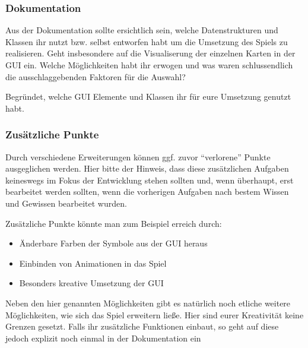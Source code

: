 \documentclass[a4paper,
			   fontsize=12pt]{article}
\begin{document}
\subsubsection*{Dokumentation}
Aus der Dokumentation sollte ersichtlich sein, welche Datenstrukturen und Klassen ihr nutzt bzw. selbst entworfen habt um die Umsetzung des Spiels zu realisieren.
Geht insbesondere auf die Visualiserung der einzelnen Karten in der GUI ein. Welche Möglichkeiten habt ihr erwogen und was waren schlussendlich die ausschlaggebenden
Faktoren für die Auswahl?

Begründet, welche GUI Elemente und Klassen ihr für eure Umsetzung genutzt habt.

\subsubsection*{Zusätzliche Punkte}
Durch verschiedene Erweiterungen können ggf. zuvor "`verlorene"' Punkte ausgeglichen werden. Hier bitte der Hinweis, dass diese zusätzlichen Aufgaben keineswegs im Fokus der Entwicklung
stehen sollten und, wenn überhaupt, erst bearbeitet werden sollten, wenn die vorherigen Aufgaben nach bestem Wissen und Gewissen bearbeitet wurden.

Zusätzliche Punkte könnte man zum Beispiel erreich durch:
\begin{itemize}
	\item Änderbare Farben der Symbole aus der GUI heraus
	\item Einbinden von Animationen in das Spiel
	\item Besonders kreative Umsetzung der GUI
\end{itemize}
Neben den hier genannten Möglichkeiten gibt es natürlich noch etliche weitere Möglichkeiten, wie sich das Spiel erweitern ließe. Hier sind eurer Kreativität keine Grenzen gesetzt. Falls ihr 
zusätzliche Funktionen einbaut, so geht auf diese jedoch explizit noch einmal in der Dokumentation ein
\end{document}
